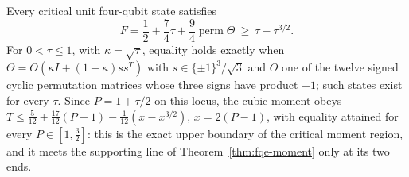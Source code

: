 \begin{proposition}\label{prop:fqe-critical-envelope}
Every critical unit four-qubit state satisfies
\[
 \boxed{\quad F=\frac12+\frac74\tau+\frac94\operatorname{perm}\Theta\ \ge\ \tau-\tau^{3/2}.\quad}
 \tag{CE}\label{eq:fqe-critical-envelope}
\]
For $0<\tau\le1$, with $\kappa=\sqrt\tau$, equality holds exactly when
$\Theta=O(\kappa I+(1-\kappa)ss^T)$ with $s\in\{\pm1\}^3/\sqrt3$ and $O$ one of the twelve signed cyclic permutation
matrices whose three signs have product $-1$; such states exist for every $\tau$. Since $P=1+\tau/2$ on this locus, the
cubic moment obeys $T\le\frac5{12}+\frac{17}{12}(P-1)-\frac1{12}(x-x^{3/2})$, $x=2(P-1)$, with equality attained for every
$P\in[1,\tfrac32]$: this is the exact upper boundary of the critical moment region, and it meets the supporting line of
Theorem~\ref{thm:fqe-moment} only at its two ends.
\end{proposition}

